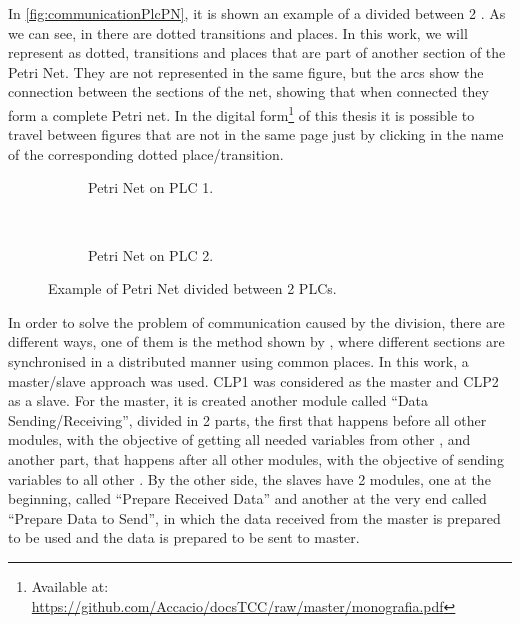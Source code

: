 In \autoref{fig:communicationPlcPN}, it is shown an example of a \CIPN{} divided
between 2 \PLCs.
As we can see, in 
there are dotted transitions and places. In this work, we will represent as
dotted, transitions and places that are part of another section of the Petri
Net. They are not represented in the same figure, 
but the arcs show the connection between the sections of the net, showing that
when connected they form a complete Petri net. In the digital form\footnote{Available at: \url{https://github.com/Accacio/docsTCC/raw/master/monografia.pdf}}  of this thesis it is possible to travel between
figures that are not in the same page just by clicking in the name of the
corresponding dotted place\slash transition.
\begin{figure}[H]
  \centering
  \begin{subfigure}[t]{0.5\textwidth}
    \center
    \caption{Petri Net on PLC 1.}
    \label{fig:communicationPlcPN1}
  \end{subfigure}%
  ~
  \begin{subfigure}[t]{0.5\textwidth}
    \centering
    \caption{Petri Net on PLC 2.}
    \label{fig:communicationPlcPN2}
  \end{subfigure}
  \caption{Example of Petri Net divided between 2 PLCs.}
  \label{fig:communicationPlcPN}
\end{figure}

In order to solve the problem of communication caused by the division, there are
different ways, one of them is the method shown by \cite{antunesfloriano2019sincronizacao}, where
different sections are synchronised in a distributed manner using common places.
In this work, a master\slash slave approach was used. CLP1 was considered as the
master and CLP2 as a slave. For the master, it is created another module
called ``Data Sending\slash Receiving'', divided in 2 parts, the first that
happens before all other modules, with the objective of getting all needed
variables from other \PLCs, and another part, that happens after all other
modules, with the objective of sending variables to all other \PLCs.
By the other side, the slaves have 2 modules, one at the beginning, called
``Prepare Received Data'' and another at the very end called ``Prepare Data to
Send'', in which the data received from the master is prepared to be used and
the data is prepared to be sent to master.

